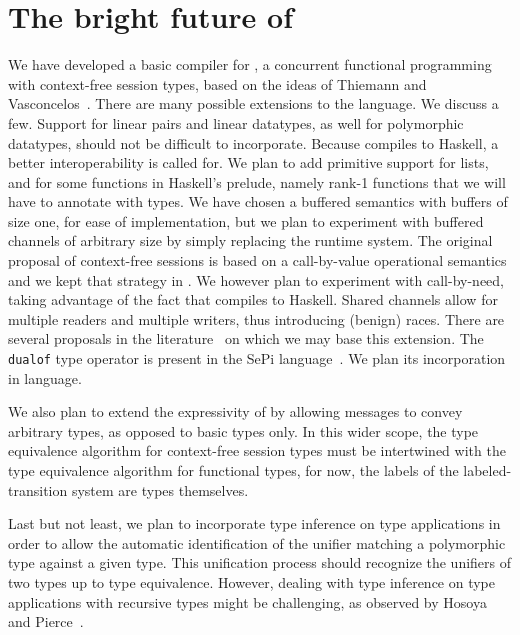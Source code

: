 \section{The bright future of \freest{}}
\label{sec:conclusion}

We have developed a basic compiler for \freest, a concurrent
functional programming with context-free session types, based on the
ideas of Thiemann and Vasconcelos~\cite{DBLP:conf/icfp/ThiemannV16}.
%
There are many possible extensions to the language. We discuss a
few.
%
Support for linear pairs and linear datatypes, as well for polymorphic
datatypes, should not be difficult to incorporate.
%
Because \freest{} compiles to Haskell, a better interoperability is
called for. We plan to add primitive support for lists, and for some
functions in Haskell's prelude, namely rank-1 functions that we will
have to annotate with \freest{} types.
%
We have chosen a buffered semantics with buffers of size one, for ease
of implementation, but we plan to experiment with buffered channels of
arbitrary size by simply replacing the runtime system.
%
The original proposal of context-free sessions is based on a
call-by-value operational semantics and we kept that strategy in
\freest. We however plan to experiment with call-by-need, taking
advantage of the fact that \freest{} compiles to Haskell.
%
Shared channels allow for multiple readers and multiple writers,
thus introducing (benign) races. There are several proposals in the
literature~\cite{DBLP:journals/pacmpl/BalzerP17,
  DBLP:conf/sefm/FrancoV13,Lindley.Morris_Lightweight.functional.session.types,DBLP:journals/iandc/Vasconcelos12}
on which we may base this extension.
%
The \lstinline|dualof| type operator is present in the SePi
language~\cite{DBLP:conf/sefm/FrancoV13}. We plan its incorporation in
\freest{} language.

We also plan to extend the expressivity of \freest{} by allowing
messages to convey arbitrary types, as opposed to basic types only.
In this wider scope, the type equivalence algorithm for context-free
session types must be intertwined with the type equivalence algorithm
for functional types, for now, the labels of the labeled-transition
system are types themselves.

Last but not least, we plan to incorporate type inference on type
applications in order to allow the automatic identification of the
unifier matching a polymorphic type against a given type. This
unification process should recognize the unifiers of two types up to
type equivalence. However, dealing with type inference on type
applications with recursive types might be challenging, as observed by
Hosoya and Pierce~\cite{DBLP:journals/toplas/PierceT00}.

